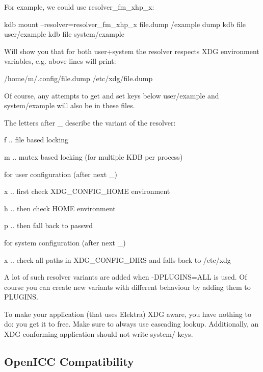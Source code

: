 For example, we could use resolver\+\_\+fm\+\_\+xhp\+\_\+x\+: \begin{DoxyVerb}kdb mount --resolver=resolver_fm_xhp_x file.dump /example dump
kdb file user/example
kdb file system/example
\end{DoxyVerb}


Will show you that for both user+system the resolver respects X\+DG environment variables, e.\+g. above lines will print\+: \begin{DoxyVerb}/home/m/.config/file.dump
/etc/xdg/file.dump
\end{DoxyVerb}


Of course, any attempts to get and set keys below user/example and system/example will also be in these files.

The letters after \+\_\+ describe the variant of the resolver\+:


\begin{DoxyItemize}
\item f .. file based locking
\item m .. mutex based locking (for multiple K\+DB per process)
\item for user configuration (after next \+\_\+)
\begin{DoxyItemize}
\item x .. first check X\+D\+G\+\_\+\+C\+O\+N\+F\+I\+G\+\_\+\+H\+O\+ME environment
\item h .. then check H\+O\+ME environment
\item p .. then fall back to passwd
\end{DoxyItemize}
\item for system configuration (after next \+\_\+)
\begin{DoxyItemize}
\item x .. check all paths in X\+D\+G\+\_\+\+C\+O\+N\+F\+I\+G\+\_\+\+D\+I\+RS and falls back to /etc/xdg
\end{DoxyItemize}
\end{DoxyItemize}

A lot of such resolver variants are added when -\/\+D\+P\+L\+U\+G\+I\+NS=A\+LL is used. Of course you can create new variants with different behaviour by adding them to P\+L\+U\+G\+I\+NS.

To make your application (that uses Elektra) X\+DG aware, you have nothing to do\+: you get it to free. Make sure to always use cascading lookup. Additionally, an X\+DG conforming application should not write system/ keys.

\subsection*{Open\+I\+CC Compatibility}

